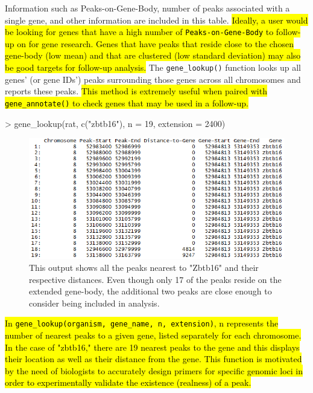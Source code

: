 \documentclass[12pt]{article}
\begin{document}
Information such as Peaks-on-Gene-Body, number of peaks associated with a single gene, and other information are included in this table. \hl{Ideally, a user would be looking for genes that have a high number of \texttt{Peaks-on-Gene-Body} to follow-up on for gene research. Genes that have peaks that reside close to the chosen gene-body (low mean) and that are clustered (low standard deviation) may also be good targets for follow-up analysis.} The \texttt{gene\_lookup()} function looks up all genes' (or gene IDs') peaks surrounding those genes across all chromosomes and reports these peaks. \hl{This method is extremely useful when paired with \texttt{gene\_annotate()} to check genes that may be used in a follow-up.}

\begin{Schunk}
\begin{Sinput}
> gene_lookup(rat, c("zbtb16"), n = 19, extension = 2400)
\end{Sinput}
\end{Schunk}

\begin{figure}[H]
\centering
\includegraphics{figures/vignette_gene_lookup_zbtb16_19.png}
\caption{This output shows all the peaks nearest to "Zbtb16" and their respective distances. Even though only 17 of the peaks reside on the extended gene-body, the additional two peaks are close enough to consider being included in analysis.}
\end{figure}

\hl{In \texttt{gene\_lookup(organism, gene\_name, n, extension)}, n represents the number of nearest peaks to a given gene, listed separately for each chromosome. In the case of "zbtb16," there are 19 nearest peaks to the gene and this displays their location as well as their distance from the gene. This function is motivated by the need of biologists to accurately design primers for specific genomic loci in order to experimentally validate the existence (realness) of a peak.}
\end{document}
